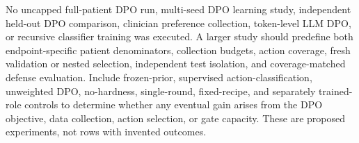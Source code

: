 No uncapped full-patient DPO run, multi-seed DPO learning study, independent held-out DPO comparison, clinician preference collection, token-level LLM DPO, or recursive classifier training was executed. A larger study should predefine both endpoint-specific patient denominators, collection budgets, action coverage, fresh validation or nested selection, independent test isolation, and coverage-matched defense evaluation. Include frozen-prior, supervised action-classification, unweighted DPO, no-hardness, single-round, fixed-recipe, and separately trained-role controls to determine whether any eventual gain arises from the DPO objective, data collection, action selection, or gate capacity. These are proposed experiments, not rows with invented outcomes.

\clearpage
